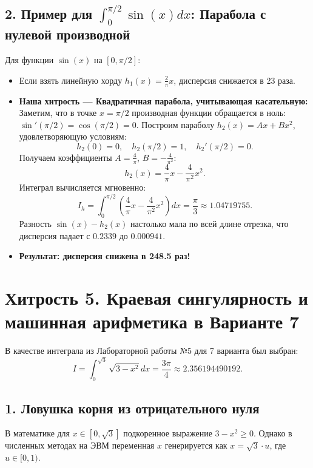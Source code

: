 \documentclass[11pt,a4paper]{article}
\begin{document}
\subsection{2. Пример для $\int_0^{\pi/2} \sin(x) dx$: Парабола с нулевой производной}
Для функции $\sin(x)$ на $[0, \pi/2]$:
\begin{itemize}
    \item Если взять линейную хорду $h_1(x) = \frac{2}{\pi}x$, дисперсия снижается в 23 раза.
    \item \textbf{Наша хитрость --- Квадратичная парабола, учитывающая касательную:}  
    Заметим, что в точке $x = \pi/2$ производная функции обращается в ноль: $\sin'(\pi/2) = \cos(\pi/2) = 0$.  
    Построим параболу $h_2(x) = A x + B x^2$, удовлетворяющую условиям:
    $$h_2(0) = 0, \quad h_2(\pi/2) = 1, \quad h_2'(\pi/2) = 0.$$
    Получаем коэффициенты $A = \frac{4}{\pi}$, $B = -\frac{4}{\pi^2}$:
    \begin{equation}
        h_2(x) = \frac{4}{\pi} x - \frac{4}{\pi^2} x^2.
    \end{equation}
    Интеграл вычисляется мгновенно:
    \begin{equation}
        I_h = \int_0^{\pi/2} \left(\frac{4}{\pi} x - \frac{4}{\pi^2} x^2\right) dx = \frac{\pi}{3} \approx 1.04719755.
    \end{equation}
    Разность $\sin(x) - h_2(x)$ настолько мала по всей длине отрезка, что дисперсия падает с $0.2339$ до $0.000941$.
    \item \textbf{Результат: дисперсия снижена в 248.5 раз!}
\end{itemize}

\newpage

\section{Хитрость 5. Краевая сингулярность и машинная арифметика в Варианте 7}

В качестве интеграла из Лабораторной работы №5 для 7 варианта был выбран:
\begin{equation}
    I = \int_0^{\sqrt{3}} \sqrt{3 - x^2} dx = \frac{3\pi}{4} \approx 2.356194490192.
\end{equation}

\subsection{1. Ловушка корня из отрицательного нуля}
В математике для $x \in [0, \sqrt{3}]$ подкоренное выражение $3 - x^2 \ge 0$.  
Однако в численных методах на ЭВМ переменная $x$ генерируется как $x = \sqrt{3} \cdot u$, где $u \in [0, 1)$.
\end{document}
